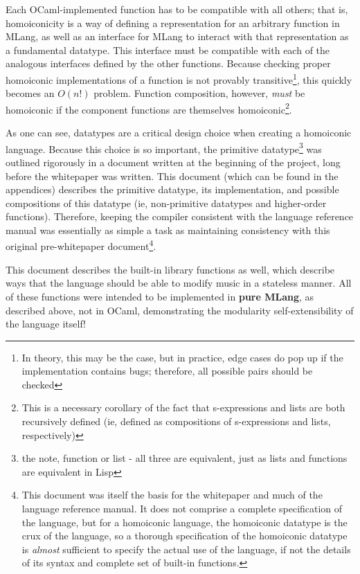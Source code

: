 \documentclass[letterpaper,11pt]{article}
\begin{document}
{Each OCaml-implemented function has to be compatible with all others; that is, homoiconicity is a way of defining a representation for an arbitrary function in MLang, as well as an interface for MLang to interact with that representation as a fundamental datatype. This interface must be compatible with each of the analogous interfaces defined by the other functions. Because checking proper homoiconic implementations of a function  is not provably transitive\footnote{In theory, this may be the case, but in practice, edge cases do pop up if the implementation contains bugs; therefore, all possible pairs should be checked}, this quickly becomes an $O(n!)$ problem. Function composition, however, \emph{must} be homoiconic if the component functions are themselves homoiconic\footnote{This is a necessary corollary of the fact that s-expressions and lists are both recursively defined (ie, defined as compositions of s-expressions and lists, respectively)}.


As one can see, datatypes are a critical design choice when creating a homoiconic language. Because this choice is so important, the primitive datatype\footnote{the note, function or list - all three are equivalent, just as lists and functions are equivalent in Lisp} was outlined rigorously in a document written at the beginning of the project, long before the whitepaper was written. This document (which can be found in the appendices) describes the primitive datatype, its implementation, and possible compositions of this datatype (ie, non-primitive datatypes and higher-order functions). Therefore, keeping the compiler consistent with the language reference manual was essentially as simple a task as maintaining consistency with this original pre-whitepaper document\footnote{This document was itself the basis for the whitepaper and much of the language reference manual. It does not comprise a complete specification of the language, but for a homoiconic language, the homoiconic datatype is the crux of the language, so a thorough specification of the homoiconic datatype is \emph{almost} sufficient to specify the actual use of the language, if not the details of its syntax and complete set of built-in functions.}.

This document describes the built-in library functions as well, which describe ways that the language should be able to modify music in a stateless manner. All of these functions were intended to be implemented in \textbf{pure MLang}, as described above, not in OCaml, demonstrating the modularity self-extensibility of the language itself!

}
\end{document}
